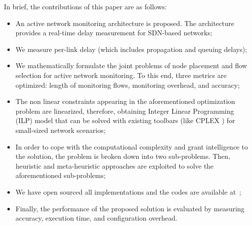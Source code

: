 \documentclass[10pt, journal, letterpaper]{IEEEtran}
\begin{document}
In brief, the contributions of this paper are as follows:
\begin{itemize}[leftmargin=*]
    \item An active network monitoring architecture is proposed. The architecture provides a real-time delay measurement for SDN-based networks;
    \item  We measure per-link delay (which includes propagation and queuing delays);
    \item We mathematically formulate the joint problems of node placement and flow selection for active network monitoring. To this end, three metrics are optimized: length of monitoring flows, monitoring overhead, and accuracy;
    \item The non linear constraints appearing in the aforementioned optimization problem are linearized, therefore, obtaining Integer Linear Programming (ILP) model that can be solved with existing toolbars (like CPLEX \cite{cplex2009v12}) for small-sized network scenarios;
    \item In order to cope with the computational complexity and grant intelligence to the solution, the problem is broken down into two sub-problems. Then, heuristic and meta-heuristic approaches are exploited to solve the aforementioned sub-problems;
    \item We have open sourced all implementations and the codes are available at~\cite{monitoringCodeOurImplementation};
    \item Finally, the performance of the proposed solution is evaluated by measuring accuracy, execution time, and configuration overhead.
\end{itemize}



\end{document}
